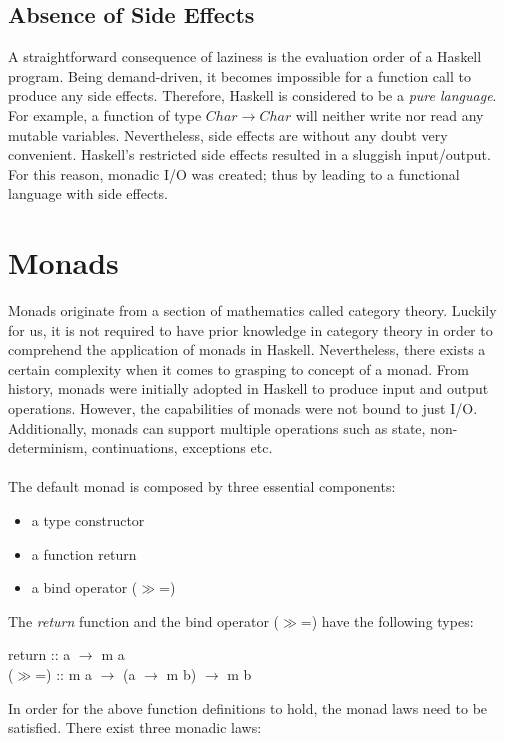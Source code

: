 \documentclass[a4paper, onecolumn]{article}
\begin{document}
\subsection{Absence of Side Effects}

A straightforward consequence of laziness is the evaluation order of a Haskell program. Being demand-driven, it becomes impossible for a function call to produce any side effects. Therefore, Haskell is considered to be a \textit{pure language}. For example, a function of type $Char \rightarrow Char$ will neither write nor read any mutable variables. Nevertheless, side effects are without any doubt very convenient. Haskell's restricted side effects resulted in a sluggish input/output. For this reason, monadic I/O was created; thus by leading to a functional language with side effects. 
\section{Monads}
Monads originate from a section of mathematics called category theory. Luckily for us, it is not required to have prior knowledge in category theory in order to comprehend the application of monads in Haskell. 
Nevertheless, there exists a certain complexity when it comes to grasping to concept of a monad. From history, monads were initially adopted in Haskell to produce input and output operations. However, the capabilities of monads were not bound to just I/O. Additionally, monads can support multiple operations such as state, non-determinism, continuations, exceptions etc. \\ \\ 
The default monad is composed by three essential components: 
\begin{itemize}
    \item a type constructor
    \item a function return
    \item a bind operator ($\gg$=)
\end{itemize}
The \textit{return} function and the bind operator ($\gg$=) have the following types: 

\begin{center}
   return   :: a $\rightarrow$ m a \\
   ($\gg$=) :: m a $\rightarrow$ (a $\rightarrow$ m b) $\rightarrow$ m b 
   \end{center}
In order for the above function definitions to hold, the monad laws need to be satisfied. There exist three monadic laws: 
\end{document}
